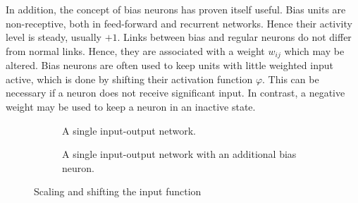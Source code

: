 \documentclass[10pt,a4paper,DIV=11]{scrreprt}
\begin{document}
In addition, the concept of bias neurons has proven itself useful. Bias units are non-receptive, both in feed-forward and recurrent networks. 
Hence their activity level is steady, usually $+1$. Links between bias and regular neurons do not differ from normal links. Hence, they are 
associated with a weight $w_{ij}$ which may be altered. Bias neurons are often used to keep units with little weighted input active, 
which is done by shifting their activation function $\varphi$. This can be necessary if a neuron does not receive significant input. 
In contrast, a negative weight may be used to keep a neuron in an inactive state.
\begin{figure}[H]

\centering
\begin{subfigure}{.5\textwidth}
  \centering
  \caption{A single input-output network.}
  \label{fig:1on1}
\end{subfigure}%
\begin{subfigure}{.5\textwidth}
    \centering
    \caption{A single input-output network with an additional bias neuron.}
    \label{fig:2on1}
\end{subfigure}
\newline
\caption{Scaling and shifting the input function}
\label{fig:networks}
\end{figure}
\end{document}
